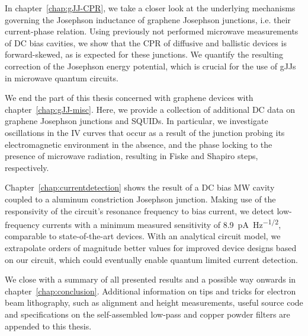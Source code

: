 In chapter~\ref{chap:gJJ-CPR}, we take a closer look at the underlying mechanisms governing the Josephson inductance of graphene Josephson junctions, i.e. their current-phase relation.
%
Using previously not performed microwave measurements of DC bias cavities, we show that the CPR of diffusive and ballistic devices is forward-skewed, as is expected for these junctions.
%
We quantify the resulting correction of the Josephson energy potential, which is crucial for the use of gJJs in microwave quantum circuits.

We end the part of this thesis concerned with graphene devices with chapter~\ref{chap:gJJ-misc}.
%
Here, we provide a collection of additional DC data on graphene Josephson junctions and SQUIDs.
%
In particular, we investigate oscillations in the IV curves that occur as a result of the junction probing its electromagnetic environment in the absence, and the phase locking to the presence of microwave radiation, resulting in Fiske and Shapiro steps, respectively.


Chapter~\ref{chap:currentdetection} shows the result of a DC bias MW cavity coupled to a aluminum constriction Josephson junction.
%
Making use of the responsivity of the circuit's resonance frequency to bias current, we detect low-frequency currents with a minimum measured sensitivity of \SI{8.9}{\pico\ampere\per\hertz\tothe{1/2}}, comparable to state-of-the-art devices.
%
With an analytical circuit model, we extrapolate orders of magnitude better values for improved device designs based on our circuit, which could eventually enable quantum limited current detection.


We close with a summary of all presented results and a possible way onwards in chapter~\ref{chap:conclusion}.
%
Additional information on tips and tricks for electron beam lithography, such as alignment and height measurements, useful source code and specifications on the self-assembled low-pass and copper powder filters are appended to this thesis.



